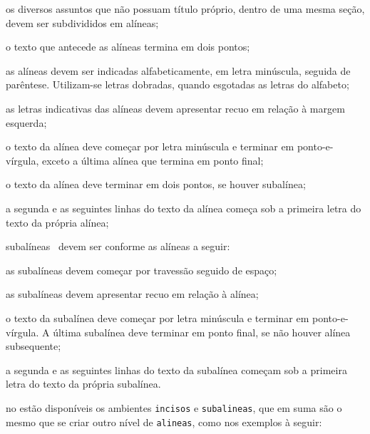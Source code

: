 \begin{alineas}

  \item os diversos assuntos que não possuam título próprio, dentro de uma mesma
  seção, devem ser subdivididos em alíneas;

  \item o texto que antecede as alíneas termina em dois pontos;
  \item as alíneas devem ser indicadas alfabeticamente, em letra minúscula,
  seguida de parêntese. Utilizam-se letras dobradas, quando esgotadas as
  letras do alfabeto;

  \item as letras indicativas das alíneas devem apresentar recuo em relação à
  margem esquerda;

  \item o texto da alínea deve começar por letra minúscula e terminar em
  ponto-e-vírgula, exceto a última alínea que termina em ponto final;

  \item o texto da alínea deve terminar em dois pontos, se houver subalínea;

  \item a segunda e as seguintes linhas do texto da alínea começa sob a
  primeira letra do texto da própria alínea;

  \item subalíneas~\cite[4.3]{NBR6024:2012} devem ser conforme as alíneas a
  seguir:

  \begin{alineas}
    \item as subalíneas devem começar por travessão seguido de espaço;

    \item as subalíneas devem apresentar recuo em relação à alínea;

    \item o texto da subalínea deve começar por letra minúscula e terminar em
    ponto-e-vírgula. A última subalínea deve terminar em ponto final, se não
    houver alínea subsequente;

    \item a segunda e as seguintes linhas do texto da subalínea começam sob a
    primeira letra do texto da própria subalínea.
  \end{alineas}

  \item no \abnTeX{} estão disponíveis os ambientes \texttt{incisos} e
  \texttt{subalineas}, que em suma são o mesmo que se criar outro nível de
  \texttt{alineas}, como nos exemplos à seguir:


\end{alineas}
